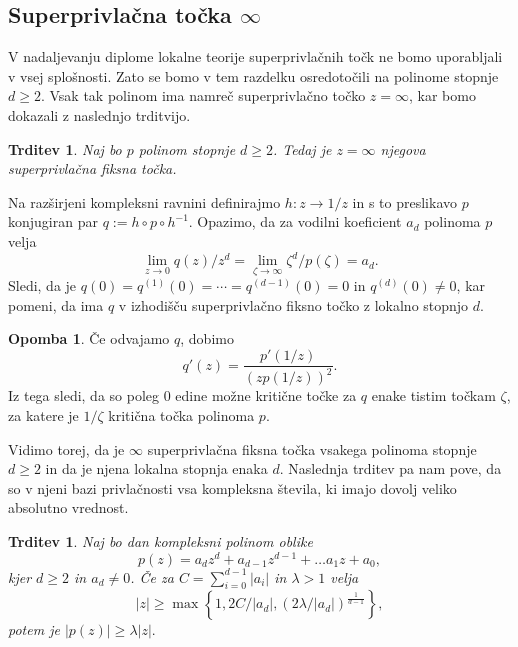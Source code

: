 \documentclass[12pt,a4paper]{amsart}
\theoremstyle{definition} %
\newtheorem{opomba}[definicija]{Opomba}
\theoremstyle{plain} %
\newtheorem{trditev}[definicija]{Trditev}
\begin{document}
\subsection{Superprivlačna točka $\infty$}
V nadaljevanju diplome lokalne teorije superprivlačnih točk ne bomo uporabljali v vsej splošnosti. 
Zato se bomo v tem razdelku osredotočili na polinome stopnje $d\geq 2$.
Vsak tak polinom ima namreč superprivlačno točko $z=\infty$,  kar bomo dokazali z naslednjo trditvijo.

\begin{trditev}
Naj bo $p$ polinom stopnje $d\geq2$. 
Tedaj je $z=\infty$ njegova superprivlačna fiksna točka.
\end{trditev}

\proof
Na razširjeni kompleksni ravnini definirajmo $h \colon z \to 1/z$ in s to preslikavo $p$ konjugiran par 
$q := h \circ p \circ h^{-1}$. Opazimo, da za vodilni koeficient $a_d$ polinoma $p$ velja
$$\lim_{z\to0} q(z) / z^d = \lim_{\zeta\to\infty} \zeta^d / p(\zeta) = a_d.$$
Sledi, da je $q(0) = q^{(1)}(0) = \cdots = q^{(d-1)}(0) = 0$ in $q^{(d)}(0) \neq 0$,
kar pomeni, da ima $q$ v izhodišču superprivlačno fiksno točko z lokalno stopnjo $d$.
\endproof

\begin{opomba}\label{op:conjCriticalP}
Če odvajamo $q$, dobimo
$$q'(z) = \frac{p'(1/z)}{(zp(1/z))^2}.$$
Iz tega sledi, da so poleg $0$ edine možne kritične točke za $q$ 
enake tistim točkam $\zeta$, za katere je $1/\zeta$ kritična točka polinoma $p$.
\end{opomba}

Vidimo torej, da je $\infty$ superprivlačna fiksna točka vsakega polinoma stopnje $d\geq 2$ in 
da je njena lokalna stopnja enaka $d$.
Naslednja trditev pa nam pove, da so v njeni bazi privlačnosti vsa kompleksna števila, 
ki imajo dovolj veliko absolutno vrednost.

\begin{trditev}\label{trd:escaperadius}
Naj bo dan kompleksni polinom oblike
$$p(z) = a_{d} z^{d} + a_{d-1} z^{d-1} + \dots a_1 z + a_0,$$
kjer $d\geq 2$ in $a_d \neq 0$.
Če za $C = \sum_{i = 0}^{d-1}|a_i|$ in $\lambda > 1$ velja
$$|z| \geq \max\left\{1, 2C / |a_d|, \left(2\lambda / |a_d|\right)^{\frac{1}{d -  1}}\right\},$$ 
potem je $|p(z)| \geq \lambda |z|.$
\end{trditev}
\end{document}
